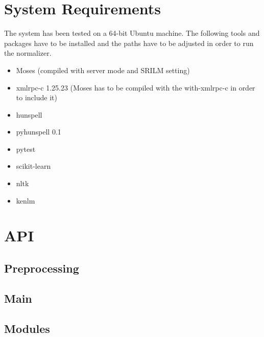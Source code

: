 \documentclass[letterpaper,10pt,english]{sphinxmanual}
\begin{document}
\chapter{System Requirements}
\label{\detokenize{README:system-requirements}}\label{\detokenize{README:sys-re}}
The system has been tested on a 64-bit Ubuntu machine.
The following tools and packages have to be installed and the paths have to be adjusted in order to run the normalizer.
\begin{itemize}
\item {} 
Moses (compiled with server mode and SRILM setting)

\item {} 
xmlrpc-c 1.25.23 (Moses has to be compiled with the \textendash{}with-xmlrpc-c in order to include it)

\item {} 
hunspell

\item {} 
pyhunspell 0.1

\item {} 
pytest

\item {} 
scikit-learn

\item {} 
nltk

\item {} 
kenlm

\end{itemize}


\chapter{API}
\label{\detokenize{API:api}}\label{\detokenize{API::doc}}

\section{Preprocessing}
\label{\detokenize{API:preprocessing}}

\section{Main}
\label{\detokenize{API:main}}

\section{Modules}
\label{\detokenize{API:modules}}\label{\detokenize{API:module-norm.modules.spellcheck}}
\end{document}
